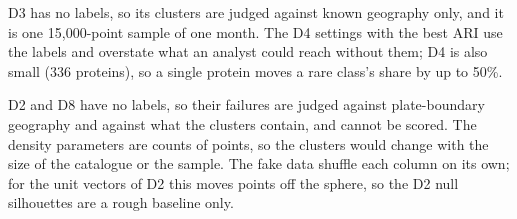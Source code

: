 D3 has no labels, so its clusters are judged against known geography only, and it is one 15{,}000-point
sample of one month. The D4 settings with the best ARI use the labels and overstate what an analyst could
reach without them; D4 is also small (336 proteins), so a single protein moves a rare class's share by up
to 50\%.

D2 and D8 have no labels, so their failures are judged against plate-boundary geography and against what
the clusters contain, and cannot be scored. The density parameters are counts of points, so the clusters
would change with the size of the catalogue or the sample. The fake data shuffle each column on its own;
for the unit vectors of D2 this moves points off the sphere, so the D2 null silhouettes are a rough
baseline only.

